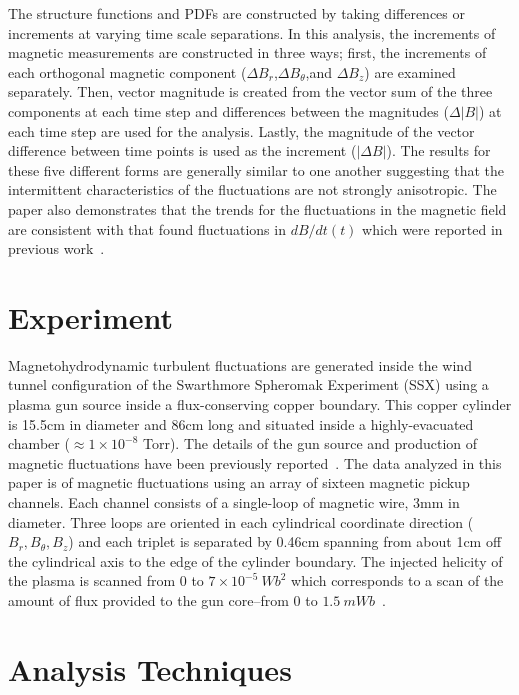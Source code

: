 \documentclass[aps,prl,amsmath,amssymb,reprint,superscriptaddress]{revtex4-1} %
\begin{document}
The structure functions and PDFs are constructed by taking differences or increments at varying time scale separations. In this analysis, the increments of magnetic measurements are constructed in three ways; first, the increments of each orthogonal magnetic component ($\Delta B_r$,$\Delta B_{\theta}$,and $\Delta B_z$) are examined separately. Then, vector magnitude is created from the vector sum of the three components at each time step and differences between the magnitudes ($\Delta |B|$) at each time step are used for the analysis. Lastly, the magnitude of the vector difference between time points is used as the increment ($|\Delta B|$). The results for these five different forms are generally similar to one another suggesting that the intermittent characteristics of the fluctuations are not strongly anisotropic. The paper also demonstrates that the trends for the fluctuations in the magnetic field are consistent with that found fluctuations in $dB/dt(t)$ which were reported in previous work~\cite{schaffner2014a,schaffner2014b}.

\section{Experiment}\label{sec:experiment}

Magnetohydrodynamic turbulent fluctuations are generated inside the wind tunnel configuration of the Swarthmore Spheromak Experiment (SSX) using a plasma gun source inside a flux-conserving copper boundary. This copper cylinder is 15.5cm in diameter and 86cm long and situated inside a highly-evacuated chamber ($\approx 1 \times 10^{-8}$ Torr). The details of the gun source and production of magnetic fluctuations have been previously reported~\cite{schaffner2014c,brown14,brown15a}. The data analyzed in this paper is of magnetic fluctuations using an array of sixteen magnetic pickup channels. Each channel consists of a single-loop of magnetic wire, 3mm in diameter. Three loops are oriented in each cylindrical coordinate direction ($B_{r},B_{\theta},B_{z}$) and each triplet is separated by 0.46cm spanning from about 1cm off the cylindrical axis to the edge of the cylinder boundary. The injected helicity of the plasma is scanned from $0$ to $7\times 10^{-5}~Wb^{2}$ which corresponds to a scan of the amount of flux provided to the gun core--from $0$ to $1.5~mWb$~\cite{schaffner2014b}.

\section{Analysis Techniques}\label{sec:analysis}
\end{document}
